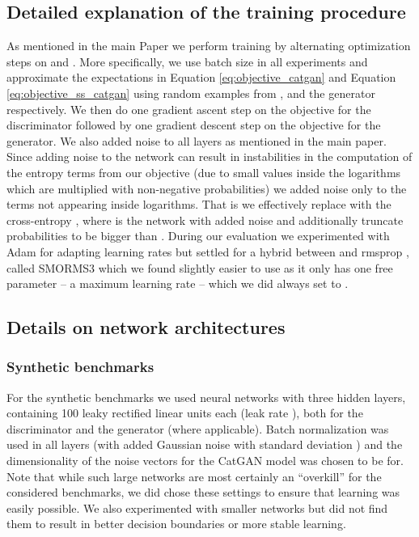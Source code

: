 \documentclass{article} \usepackage{iclr2016_conference,times}
\begin{document}
\begin{appendix}
\section{Detailed explanation of the training procedure}
As mentioned in the main Paper we perform training by alternating
optimization steps on  and . More
specifically, we use batch size  in all experiments and
approximate the expectations in Equation \eqref{eq:objective_catgan}
and Equation \eqref{eq:objective_ss_catgan} using  random
examples from ,  and the generator
 respectively. We then do one gradient ascent step on the
objective for the discriminator followed by one gradient descent step
on the objective for the generator. We also added noise to all layers
as mentioned in the main paper. Since adding noise to the network can
result in instabilities in the computation of the entropy terms from
our objective (due to small values inside the logarithms which are
multiplied with non-negative probabilities) we added noise only to the
terms not appearing inside logarithms. That is we effectively replace
 with the cross-entropy
, where  is the
network with added noise and additionally truncate probabilities to be
bigger than .  During our evaluation we experimented with Adam
\citep{Kingma_2015} for adapting learning rates but settled for a
hybrid between \citep{Schaul2013pesky} and rmsprop
\citep{Tieleman2012}, called SMORMS3 \citep{Funk_2015} which we found
slightly easier to use as it only has one free parameter -- a maximum
learning rate -- which we did always set to .

\subsection{Details on network architectures}
\subsubsection{Synthetic benchmarks}
For the synthetic benchmarks we used neural networks with three hidden
layers, containing 100 leaky rectified linear units each (leak rate
), both for the discriminator and the generator (where
applicable). Batch normalization was used in all layers (with added
Gaussian noise with standard deviation ) and the dimensionality
of the noise vectors  for the CatGAN model was chosen to be 
for. Note that while such large networks are most certainly an
``overkill'' for the considered benchmarks, we did chose these
settings to ensure that learning was easily possible. We also
experimented with smaller networks but did not find them to result in
better decision boundaries or more stable learning.


\end{appendix}
\end{document}
